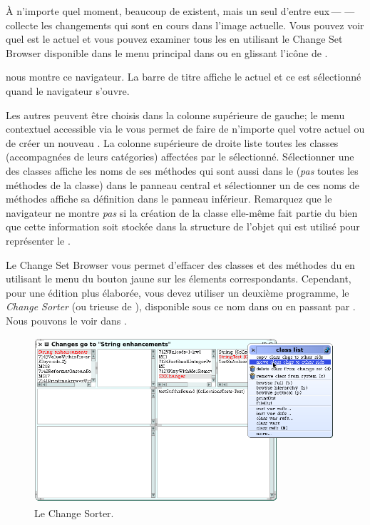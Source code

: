 \documentclass[a4paper,10pt,twoside]{book}
\begin{document}
\`A n'importe quel moment, beaucoup de \changesets existent, mais un seul d'entre eux\,---\,\,---\,collecte les changements qui sont en cours dans l'image actuelle.
Vous pouvez voir quel \changeset est le \changeset actuel et vous pouvez examiner
tous les \changesets en utilisant le Change Set Browser disponible dans le menu
principal dans  ou en glissant l'ic\^one
 de \toolsflapind.

 nous montre ce navigateur. La barre de titre affiche le \changeset actuel et ce \changeset est s\'electionn\'e quand le navigateur s'ouvre.

Les autres \changesets peuvent \^etre choisis dans la colonne sup\'erieure de gauche;
le menu contextuel accessible via le  vous permet de faire de
n'importe quel \changeset votre \changeset actuel ou de cr\'eer un nouveau \changeset.
La colonne sup\'erieure de droite liste toutes les classes 
(accompagn\'ees de leurs cat\'egories) affect\'ees par le \changeset s\'electionn\'e.
S\'electionner une des classes affiche les noms de ses m\'ethodes qui sont aussi dans
le \changeset (\emph{pas} toutes les m\'ethodes de la classe) dans le panneau central
et s\'electionner un de ces noms de m\'ethodes affiche sa d\'efinition dans le panneau
inf\'erieur.
Remarquez que le navigateur ne montre \emph{pas} si la cr\'eation de la classe elle-m\^eme
fait partie du \changeset bien que cette information soit stock\'ee dans la structure
de l'objet qui est utilis\'e pour repr\'esenter le \changeset.

Le Change Set Browser vous permet d'effacer des classes et des m\'ethodes du \changeset
en utilisant le menu du bouton jaune sur les \'elements correspondants. 
Cependant, pour une \'edition plus \'elabor\'ee, vous devez utiliser un deuxi\`eme
programme, le \textit{Change Sorter} (ou trieuse de \changeset), disponible sous ce nom dans 
\toolsflap ou en passant par . Nous
pouvons le voir dans .

\begin{figure}[btp]
	\begin{center}
		\includegraphics[width=\linewidth]{changeSorter}
	\end{center}
	\caption{Le Change Sorter.}
	\label{fig:changeSorter}
\end{figure}
\end{document}
